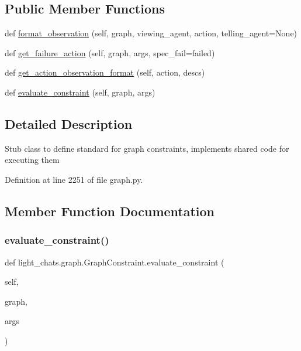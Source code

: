 \subsection*{Public Member Functions}
\begin{DoxyCompactItemize}
\item 
def \hyperlink{classlight__chats_1_1graph_1_1GraphConstraint_aa2918a7125065dcd76dd0ee09650fd38}{format\+\_\+observation} (self, graph, viewing\+\_\+agent, action, telling\+\_\+agent=None)
\item 
def \hyperlink{classlight__chats_1_1graph_1_1GraphConstraint_ac824a43559c367bf625f79559f026c6b}{get\+\_\+failure\+\_\+action} (self, graph, args, spec\+\_\+fail=\textquotesingle{}failed\textquotesingle{})
\item 
def \hyperlink{classlight__chats_1_1graph_1_1GraphConstraint_a53754bb6025c16b76718f44dad075733}{get\+\_\+action\+\_\+observation\+\_\+format} (self, action, descs)
\item 
def \hyperlink{classlight__chats_1_1graph_1_1GraphConstraint_ac196aba3dee4fc3bf7284dc764866659}{evaluate\+\_\+constraint} (self, graph, args)
\end{DoxyCompactItemize}


\subsection{Detailed Description}
\begin{DoxyVerb}Stub class to define standard for graph constraints, implements shared
code for executing them
\end{DoxyVerb}
 

Definition at line 2251 of file graph.\+py.



\subsection{Member Function Documentation}
\mbox{\label{classlight__chats_1_1graph_1_1GraphConstraint_ac196aba3dee4fc3bf7284dc764866659}} 
\subsubsection{\texorpdfstring{evaluate\+\_\+constraint()}{evaluate\_constraint()}}
{\footnotesize\ttfamily def light\+\_\+chats.\+graph.\+Graph\+Constraint.\+evaluate\+\_\+constraint (\begin{DoxyParamCaption}\item[{}]{self,  }\item[{}]{graph,  }\item[{}]{args }\end{DoxyParamCaption})}


